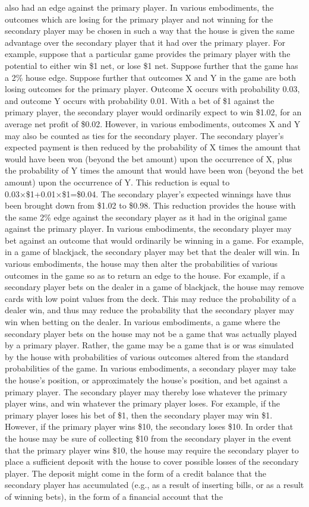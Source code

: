 \documentclass[11pt,a4paper]{article}
\begin{document}
also had an edge against the primary player. In various embodiments, the outcomes which are losing for the primary player and not winning for the secondary player may be chosen in such a way that the house is given the same advantage over the secondary player that it had over the primary player. For example, suppose that a particular game provides the primary player with the potential to either win \$1 net, or lose \$1 net. Suppose further that the game has a 2\% house edge. Suppose further that outcomes X and Y in the game are both losing outcomes for the primary player. Outcome X occurs with probability 0.03, and outcome Y occurs with probability 0.01. With a bet of \$1 against the primary player, the secondary player would ordinarily expect to win \$1.02, for an average net profit of \$0.02. However, in various embodiments, outcomes X and Y may also be counted as ties for the secondary player. The secondary player's expected payment is then reduced by the probability of X times the amount that would have been won (beyond the bet amount) upon the occurrence of X, plus the probability of Y times the amount that would have been won (beyond the bet amount) upon the occurrence of Y. This reduction is equal to 0.03×\$1+0.01×\$1=\$0.04. The secondary player's expected winnings have thus been brought down from \$1.02 to \$0.98. This reduction provides the house with the same 2\% edge against the secondary player as it had in the original game against the primary player. In various embodiments, the secondary player may bet against an outcome that would ordinarily be winning in a game. For example, in a game of blackjack, the secondary player may bet that the dealer will win. In various embodiments, the house may then alter the probabilities of various outcomes in the game so as to return an edge to the house. For example, if a secondary player bets on the dealer in a game of blackjack, the house may remove cards with low point values from the deck. This may reduce the probability of a dealer win, and thus may reduce the probability that the secondary player may win when betting on the dealer. In various embodiments, a game where the secondary player bets on the house may not be a game that was actually played by a primary player. Rather, the game may be a game that is or was simulated by the house with probabilities of various outcomes altered from the standard probabilities of the game. In various embodiments, a secondary player may take the house's position, or approximately the house's position, and bet against a primary player. The secondary player may thereby lose whatever the primary player wins, and win whatever the primary player loses. For example, if the primary player loses his bet of \$1, then the secondary player may win \$1. However, if the primary player wins \$10, the secondary loses \$10. In order that the house may be sure of collecting \$10 from the secondary player in the event that the primary player wins \$10, the house may require the secondary player to place a sufficient deposit with the house to cover possible losses of the secondary player. The deposit might come in the form of a credit balance that the secondary player has accumulated (e.g., as a result of inserting bills, or as a result of winning bets), in the form of a financial account that the 
\end{document}

